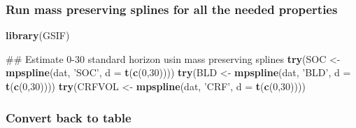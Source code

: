 \documentclass[10pt,b5paper,]{book}
\newenvironment{Shaded}{\begin{snugshade}}{\end{snugshade}}
\newcommand{\DataTypeTok}[1]{\textcolor[rgb]{0.13,0.29,0.53}{#1}}
\newcommand{\DecValTok}[1]{\textcolor[rgb]{0.00,0.00,0.81}{#1}}
\newcommand{\KeywordTok}[1]{\textcolor[rgb]{0.13,0.29,0.53}{\textbf{#1}}}
\newcommand{\NormalTok}[1]{#1}
\newcommand{\OperatorTok}[1]{\textcolor[rgb]{0.81,0.36,0.00}{\textbf{#1}}}
\newcommand{\StringTok}[1]{\textcolor[rgb]{0.31,0.60,0.02}{#1}}
\theoremstyle{definition}
\theoremstyle{definition}
\theoremstyle{definition}
\theoremstyle{remark}
\begin{document}
\hypertarget{run-mass-preserving-splines-for-all-the-needed-properties}{%
\subsubsection{Run mass preserving splines for all the needed
properties}\label{run-mass-preserving-splines-for-all-the-needed-properties}}

\begin{Shaded}
\begin{Highlighting}[]
\KeywordTok{library}\NormalTok{(GSIF)}

\NormalTok{## Estimate 0-30 standard horizon usin mass preserving splines}
\KeywordTok{try}\NormalTok{(SOC <-}\StringTok{ }\KeywordTok{mpspline}\NormalTok{(dat, }\StringTok{'SOC'}\NormalTok{, }\DataTypeTok{d =} \KeywordTok{t}\NormalTok{(}\KeywordTok{c}\NormalTok{(}\DecValTok{0}\NormalTok{,}\DecValTok{30}\NormalTok{))))}
\KeywordTok{try}\NormalTok{(BLD <-}\StringTok{ }\KeywordTok{mpspline}\NormalTok{(dat, }\StringTok{'BLD'}\NormalTok{, }\DataTypeTok{d =} \KeywordTok{t}\NormalTok{(}\KeywordTok{c}\NormalTok{(}\DecValTok{0}\NormalTok{,}\DecValTok{30}\NormalTok{))))}
\KeywordTok{try}\NormalTok{(CRFVOL <-}\StringTok{ }\KeywordTok{mpspline}\NormalTok{(dat, }\StringTok{'CRF'}\NormalTok{, }\DataTypeTok{d =} \KeywordTok{t}\NormalTok{(}\KeywordTok{c}\NormalTok{(}\DecValTok{0}\NormalTok{,}\DecValTok{30}\NormalTok{))))}
\end{Highlighting}
\end{Shaded}

\hypertarget{convert-back-to-table}{%
\subsubsection{Convert back to table}\label{convert-back-to-table}}

\begin{Shaded}
\end{Shaded}
\end{document}
